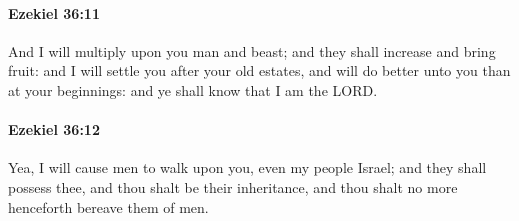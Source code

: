 		\paragraph{Ezekiel 36:11} %
			\label{EZEKIEL-36-11}

			And I will multiply upon you man and beast; and they shall increase and bring fruit: and I will settle you after your old estates, and will do better unto you than at your beginnings: and ye shall know that I am the LORD.


		\paragraph{Ezekiel 36:12} %
			\label{EZEKIEL-36-12}

			Yea, I will cause men to walk upon you, even my people Israel; and they shall possess thee, and thou shalt be their inheritance, and thou shalt no more henceforth bereave them of men.

